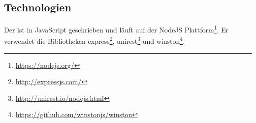 \subsection{Technologien}
    Der {\annotationService} ist in JavaScript geschrieben und läuft auf der
    NodeJS Plattform\footnote{\url{https://nodejs.org/}}.
    Er verwendet die Bibliotheken
    express\footnote{\url{http://expressjs.com/}},
    unirest\footnote{\url{http://unirest.io/nodejs.html}}
    und winston\footnote{\url{https://github.com/winstonjs/winston}}.